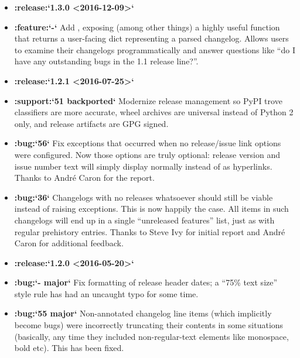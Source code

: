 \documentclass[letterpaper,10pt,english]{sphinxmanual}
\begin{document}
\begin{itemize}
\item {} 
{\color{red}\bfseries{}:release:{}`1.3.0 \textless{}2016-12-09\textgreater{}{}`}

\item {} 
{\color{red}\bfseries{}:feature:{}`-{}`} Add , exposing (among other things) a highly
useful  function that returns a user-facing dict
representing a parsed changelog. Allows users to examine their changelogs
programmatically and answer questions like “do I have any outstanding bugs in
the 1.1 release line?”.

\item {} 
{\color{red}\bfseries{}:release:{}`1.2.1 \textless{}2016-07-25\textgreater{}{}`}

\item {} 
{\color{red}\bfseries{}:support:{}`51 backported{}`} Modernize release management so PyPI trove
classifiers are more accurate, wheel archives are universal instead of Python
2 only, and release artifacts are GPG signed.

\item {} 
{\color{red}\bfseries{}:bug:{}`56{}`} Fix exceptions that occurred when no release/issue link options
were configured. Now those options are truly optional: release version and
issue number text will simply display normally instead of as hyperlinks.
Thanks to André Caron for the report.

\item {} 
{\color{red}\bfseries{}:bug:{}`36{}`} Changelogs with no releases whatsoever should still be viable
instead of raising exceptions. This is now happily the case. All items in
such changelogs will end up in a single “unreleased features” list, just as
with regular prehistory entries. Thanks to Steve Ivy for initial report and
André Caron for additional feedback.

\item {} 
{\color{red}\bfseries{}:release:{}`1.2.0 \textless{}2016-05-20\textgreater{}{}`}

\item {} 
{\color{red}\bfseries{}:bug:{}`- major{}`} Fix formatting of release header dates; a “75\% text size”
style rule has had an uncaught typo for some time.

\item {} 
{\color{red}\bfseries{}:bug:{}`55 major{}`} Non-annotated changelog line items (which implicitly become
bugs) were incorrectly truncating their contents in some situations
(basically, any time they included non-regular-text elements like monospace,
bold etc). This has been fixed.


\end{itemize}
\end{document}
